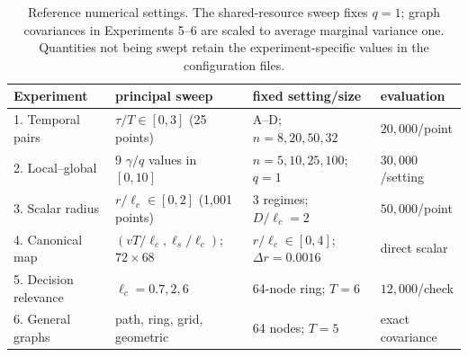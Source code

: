 \begin{table}[H]
\centering
\caption{Reference numerical settings. The shared-resource sweep fixes $q=1$;
graph covariances in Experiments 5--6 are scaled to average marginal variance
one. Quantities not being swept retain the experiment-specific values in the
configuration files.}
\label{tab:numerical-parameters}
\small
\begin{tabular}{llll}
\toprule
Experiment & principal sweep & fixed setting/size & evaluation \\
\midrule
1. Temporal pairs & $\tau/T\in[0,3]$ (25 points) & A--D; $n=8,20,50,32$ & $20{,}000$/point \\
2. Local--global & 9 $\gamma/q$ values in $[0,10]$ & $n=5,10,25,100$; $q=1$ & $30{,}000$/setting \\
3. Scalar radius & $r/\ell_c\in[0,2]$ (1,001 points) & 3 regimes; $D/\ell_c=2$ & $50{,}000$/point \\
4. Canonical map & $(vT/\ell_c,\ell_s/\ell_c)$; $72\times68$ & $r/\ell_c\in[0,4]$; $\Delta r=0.0016$ & direct scalar \\
5. Decision relevance & $\ell_c=0.7,2,6$ & 64-node ring; $T=6$ & $12{,}000$/check \\
6. General graphs & path, ring, grid, geometric & 64 nodes; $T=5$ & exact covariance \\
\bottomrule
\end{tabular}
\end{table}
